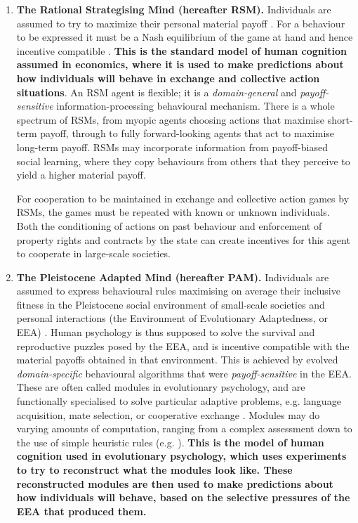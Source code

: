 \documentclass[10pt, a4paper, fleqn]{article}
\begin{document}
 
 \renewcommand{\labelenumi}{(\arabic{enumi})}
 \begin{enumerate}
 
 \item \textbf{The Rational Strategising Mind (hereafter RSM).} Individuals are assumed to try to maximize their personal material payoff \citep{MasCollelWG95,Ober:2008:a,Fukuyama:2011:a}. For a behaviour to be expressed it must be a Nash equilibrium of the game at hand and hence incentive compatible \citep{Kreps:1988:a,Hurwicz:1996:a,Fudenberg:1991:a}. \textbf{This is the standard model of human cognition assumed in economics, where it is used to make predictions about how individuals will behave in exchange and collective action situations}. An RSM agent is flexible; it is a \textit{domain-general} and \textit{payoff-sensitive} information-processing behavioural mechanism. There is a whole spectrum of RSMs, from myopic agents choosing actions that maximise short-term payoff, through to fully forward-looking agents that act to maximise long-term payoff. RSMs may incorporate information from payoff-biased social learning, where they copy behaviours from others that they perceive to yield a higher material payoff. 
 
For cooperation to be maintained in exchange and collective action games by RSMs, the games must be repeated with known or unknown individuals. Both the conditioning of actions on past behaviour and enforcement of property rights and contracts by the state can create incentives for this agent to cooperate in large-scale societies.  

 
\item \textbf{The Pleistocene Adapted Mind (hereafter PAM).} Individuals are assumed to express behavioural rules maximising on average their inclusive fitness in the Pleistocene social environment of small-scale societies and personal interactions (the Environment of Evolutionary Adaptedness, or EEA) \citep{Alexander:1990:a,Barkow:1992:a,Cosmides:2013:a}. Human psychology is thus supposed to solve the survival and reproductive puzzles posed by the EEA, and is incentive compatible with the material payoffs obtained in that environment. This is achieved by evolved \textit{domain-specific} behavioural algorithms that were \textit{payoff-sensitive} in the EEA. These are often called modules in evolutionary psychology, and are functionally specialised to solve particular adaptive problems, e.g. language acquisition, mate selection, or cooperative exchange \citep{Lumsden:1981:a,Alexander:1990:a} \citep[p.~24]{Barkow:1992:a}. Modules may do varying amounts of computation, ranging from a complex assessment down to the use of simple heuristic rules (e.g. \citealt{Gigerenzer:2009:a}). \textbf{This is the model of human cognition used in evolutionary psychology, which uses experiments  to try to reconstruct what the modules look like. These reconstructed modules are then used to make predictions about how individuals will behave, based on the selective pressures of the EEA that produced them\citep{Cosmides:1994:a}.} 


\end{enumerate}
\end{document}
